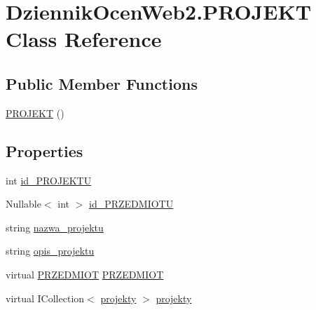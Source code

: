 \hypertarget{class_dziennik_ocen_web2_1_1_p_r_o_j_e_k_t}{}\section{Dziennik\+Ocen\+Web2.\+P\+R\+O\+J\+E\+KT Class Reference}
\label{class_dziennik_ocen_web2_1_1_p_r_o_j_e_k_t}
\subsection*{Public Member Functions}
\begin{DoxyCompactItemize}
\item 
\hyperlink{class_dziennik_ocen_web2_1_1_p_r_o_j_e_k_t_a75c1a0773b2350ed7341d6b1089ced90}{P\+R\+O\+J\+E\+KT} ()
\end{DoxyCompactItemize}
\subsection*{Properties}
\begin{DoxyCompactItemize}
\item 
int \hyperlink{class_dziennik_ocen_web2_1_1_p_r_o_j_e_k_t_abb785d4a4041798f2821f83c77497032}{id\+\_\+\+P\+R\+O\+J\+E\+K\+TU}
\item 
Nullable$<$ int $>$ \hyperlink{class_dziennik_ocen_web2_1_1_p_r_o_j_e_k_t_a5d1013fc6420908499195821e393864a}{id\+\_\+\+P\+R\+Z\+E\+D\+M\+I\+O\+TU}
\item 
string \hyperlink{class_dziennik_ocen_web2_1_1_p_r_o_j_e_k_t_a2ecf2225caa21996453cc82110bef760}{nazwa\+\_\+projektu}
\item 
string \hyperlink{class_dziennik_ocen_web2_1_1_p_r_o_j_e_k_t_aa221ed522d380620586a91300738d0cc}{opis\+\_\+projektu}
\item 
virtual \hyperlink{class_dziennik_ocen_web2_1_1_p_r_z_e_d_m_i_o_t}{P\+R\+Z\+E\+D\+M\+I\+OT} \hyperlink{class_dziennik_ocen_web2_1_1_p_r_o_j_e_k_t_aa9a826689c26127e29cc455b9cd9518d}{P\+R\+Z\+E\+D\+M\+I\+OT}
\item 
virtual I\+Collection$<$ \hyperlink{class_dziennik_ocen_web2_1_1projekty}{projekty} $>$ \hyperlink{class_dziennik_ocen_web2_1_1_p_r_o_j_e_k_t_afb3ac65ee2f14cc791decb4b8828210a}{projekty}
\end{DoxyCompactItemize}


